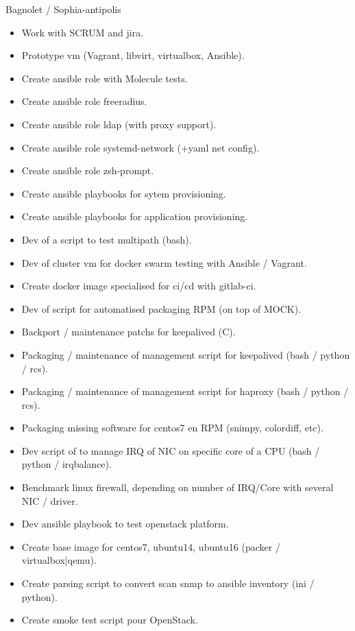 \documentclass[10pt,a4paper,sans]{moderncv}
\begin{document}
\vskip 2cm

{Bagnolet / Sophia-antipolis}{
  \begin{itemize}%
    \item Work with SCRUM and jira.
    \item Prototype vm (Vagrant, libvirt, virtualbox, Ansible).
    \item Create ansible role with  Molecule tests.
    \item Create ansible role freeradius.
    \item Create ansible role ldap (with proxy support).
    \item Create ansible role systemd-network (+yaml net config).
    \item Create ansible role zsh-prompt.
    \item Create ansible playbooks for sytem provisioning.
    \item Create ansible playbooks for application provisioning.
    \item Dev of a script to test multipath (bash).
    \item Dev of cluster vm for docker swarm testing with Ansible / Vagrant.
    \item Create docker image specialised for ci/cd with gitlab-ci.
    \item Dev of script for automatised packaging RPM (on top of MOCK).
    \item Backport / maintenance patchs for keepalived (C).
    \item Packaging / maintenance of management script for keepalived (bash / python / rcs).
    \item Packaging / maintenance of management script for haproxy (bash / python / rcs).
    \item Packaging missing software for centos7 en RPM (snimpy, colordiff, etc).
    \item Dev script of to manage IRQ of NIC on specific core of a CPU (bash / python / irqbalance).
    \item Benchmark linux firewall, depending on number of IRQ/Core with several NIC / driver.
    \item Dev ansible playbook to test openstack platform.
    \item Create base image for centos7, ubuntu14, ubuntu16 (packer / virtualbox|qemu).
    \item Create parsing script to convert scan snmp to ansible inventory (ini / python).
    \item Create smoke test script pour OpenStack.

\end{itemize}}
\end{document}
